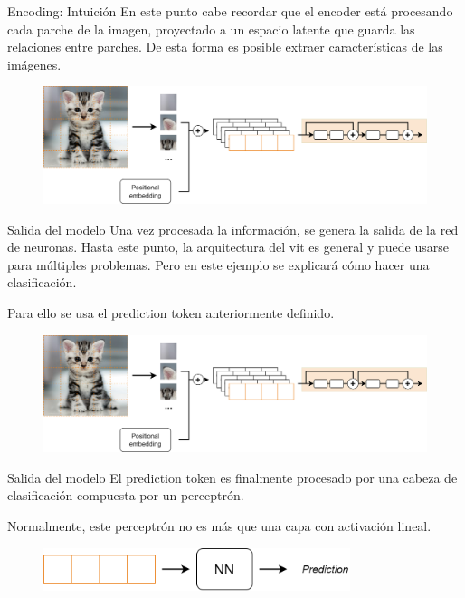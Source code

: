 \begin{frame}{Encoding: Intuición}
En este punto cabe recordar que el \alert{encoder} está procesando cada parche de la imagen, \alert{proyectado} a un espacio latente que guarda las \alert{relaciones entre parches}. De esta forma es posible \alert{extraer características} de las imágenes.

\begin{figure}
    \centering
    \includegraphics[width=\textwidth]{figures/Vision_Transformers/Encoding_Processing.png}
\end{figure}
\end{frame}

\begin{frame}{Salida del modelo}
Una vez procesada la información, se genera la \alert{salida} de la red de neuronas. Hasta este punto, la arquitectura del \gls{vit} es general y puede usarse para múltiples problemas. Pero en este ejemplo se explicará cómo hacer una \alert{clasificación}.

Para ello se usa el \alert{prediction token} anteriormente definido.

\begin{figure}
    \centering
    \includegraphics[width=\textwidth]{figures/Vision_Transformers/Encoding_Processing.png}
\end{figure}
\end{frame}

\begin{frame}{Salida del modelo}
El prediction token es finalmente procesado por una \alert{cabeza de clasificación} compuesta por un \alert{perceptrón}.

Normalmente, este perceptrón no es más que una capa con activación lineal.

\begin{figure}
    \centering
    \includegraphics[width=0.8\textwidth]{figures/Vision_Transformers/Output.png}
\end{figure}
\end{frame}

